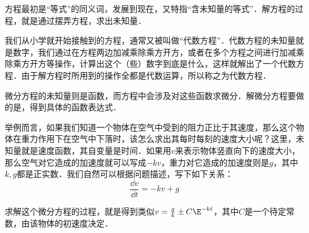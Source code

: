 
方程最初是“等式”的同义词，发展到现在，又特指“含未知量的等式”．解方程的过程，就是通过摆弄方程，求出未知量．

我们从小学就开始接触到的方程，通常又被叫做“代数方程”．代数方程的未知量就是数字，我们通过在方程两边加减乘除乘方开方，或者在多个方程之间进行加减乘除乘方开方等操作，计算出这个（些）数字到底是什么，这样就解出了一个代数方程．由于解方程时所用到的操作全都是代数运算，所以称之为代数方程．

微分方程的未知量则是函数，而方程中会涉及对这些函数求微分．解微分方程要做的是，得到具体的函数表达式．

举例而言，如果我们知道一个物体在空气中受到的阻力正比于其速度，那么这个物体在重力作用下在空气中下落时，该怎么求出其每时每刻的速度大小呢？这里，未知量就是速度函数，其自变量是时间．如果用$v$来表示物体竖直向下的速度大小，那么空气对它造成的加速度就可以写成$-kv$，重力对它造成的加速度则是$g$，其中$k, g$都是正实数．我们自然可以根据问题描述，写下如下关系：
\begin{equation}
\frac{\dd v}{\dd t}=-kv+g
\end{equation}

求解这个微分方程的过程，就是得到类似$v=\frac{g}{k}\pm C\E^{-kt}$，其中$C$是一个待定常数，由该物体的初速度决定．




















